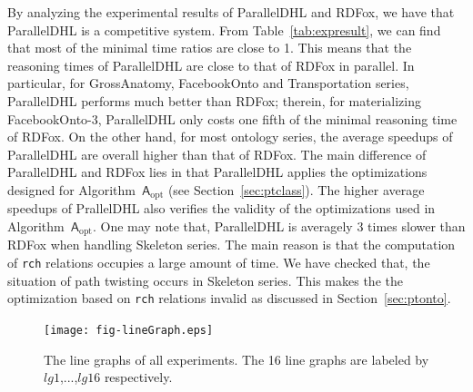 By analyzing the experimental results of ParallelDHL and RDFox, we have that
ParallelDHL is a competitive system.
From Table~\ref{tab:expresult}, we can find that most of the minimal time ratios are close to 1.
This means that the reasoning times of ParallelDHL are close to that of RDFox in parallel.
In particular, for GrossAnatomy, FacebookOnto and Transportation series, ParallelDHL performs
much better than RDFox; therein, for materializing FacebookOnto-3, ParallelDHL
only costs one fifth of the minimal reasoning time of RDFox.
On the other hand, for most ontology series,
the average speedups of ParallelDHL are overall higher than that of RDFox.
The main difference of ParallelDHL and RDFox lies in that ParallelDHL applies
the optimizations designed for Algorithm~$\mathsf{A}_{\text{opt}}$ (see Section~\ref{sec:ptclass}).
The higher average speedups of PrallelDHL also verifies the validity of the optimizations
used in Algorithm~$\mathsf{A}_{\text{opt}}$.
One may note that, ParallelDHL is averagely 3 times slower than RDFox when handling Skeleton series.
The main reason is that the computation of \texttt{rch} relations
occupies a large amount of time. We have checked that, the situation of path twisting occurs in Skeleton series.
This makes the the optimization based on \texttt{rch} relations invalid as discussed
in Section~\ref{sec:ptonto}.


\begin{figure}[htbp]
\begin{center}
\texttt{[image: fig-lineGraph.eps]}
\caption{The line graphs of all experiments. The 16 line graphs are labeled by $lg1$,...,$lg16$ respectively.}
\label{fig:linegraph}
\end{center}
\end{figure}

